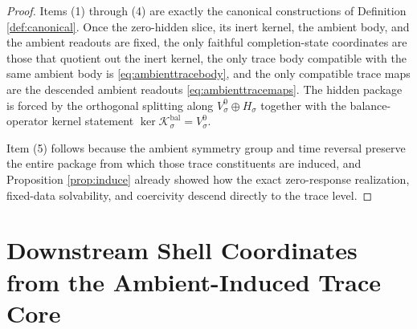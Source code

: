 \documentclass[11pt]{article}
\newcommand{\ZeroHiddenVec}[1]{V_{#1}^{0}}
\newcommand{\BalOp}[1]{\mathcal K_{#1}^{\mathrm{bal}}}
\newcommand{\GapSpace}[1]{H_{#1}}
\begin{document}
\begin{proof}
Items (1) through (4) are exactly the canonical constructions of Definition \ref{def:canonical}. Once the zero-hidden slice, its inert kernel, the ambient body, and the ambient readouts are fixed, the only faithful completion-state coordinates are those that quotient out the inert kernel, the only trace body compatible with the same ambient body is \eqref{eq:ambienttracebody}, and the only compatible trace maps are the descended ambient readouts \eqref{eq:ambienttracemaps}. The hidden package is forced by the orthogonal splitting along \(\ZeroHiddenVec{\sigma}\oplus\GapSpace{\sigma}\) together with the balance-operator kernel statement \(\ker\BalOp{\sigma}=\ZeroHiddenVec{\sigma}\).

Item (5) follows because the ambient symmetry group and time reversal preserve the entire package from which those trace constituents are induced, and Proposition \ref{prop:induce} already showed how the exact zero-response realization, fixed-data solvability, and coercivity descend directly to the trace level.
\end{proof}

\section{Downstream Shell Coordinates from the Ambient-Induced Trace Core}
\end{document}
